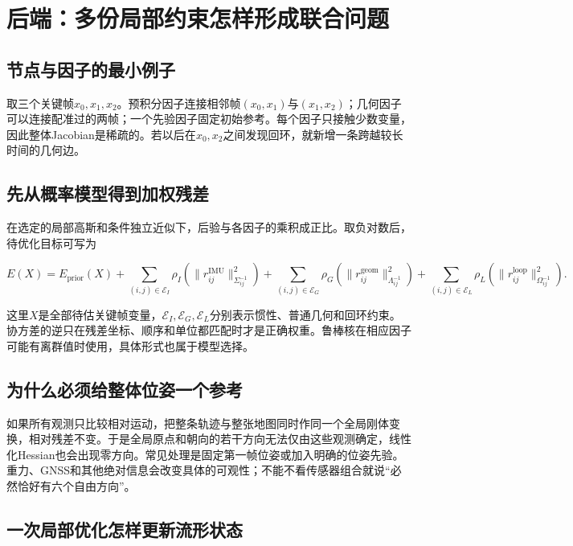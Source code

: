 \section{后端：多份局部约束怎样形成联合问题}

\subsection{节点与因子的最小例子}

取三个关键帧$x_0,x_1,x_2$。预积分因子连接相邻帧$(x_0,x_1)$与$(x_1,x_2)$；几何因子可以连接配准过的两帧；一个先验因子固定初始参考。每个因子只接触少数变量，因此整体Jacobian是稀疏的。若以后在$x_0,x_2$之间发现回环，就新增一条跨越较长时间的几何边。

\subsection{先从概率模型得到加权残差}

在选定的局部高斯和条件独立近似下，后验与各因子的乘积成正比。取负对数后，待优化目标可写为

\begin{equation*}
E(X)=E_{\mathrm{prior}}(X)
+\sum_{(i,j)\in\mathcal E_I}\rho_I\!\left(\|r_{ij}^{\mathrm{IMU}}\|_{\Sigma_{ij}^{-1}}^2\right)
+\sum_{(i,j)\in\mathcal E_G}\rho_G\!\left(\|r_{ij}^{\mathrm{geom}}\|_{\Lambda_{ij}^{-1}}^2\right)
+\sum_{(i,j)\in\mathcal E_L}\rho_L\!\left(\|r_{ij}^{\mathrm{loop}}\|_{\Omega_{ij}^{-1}}^2\right).
\end{equation*}

这里$X$是全部待估关键帧变量，$\mathcal E_I,\mathcal E_G,\mathcal E_L$分别表示惯性、普通几何和回环约束。协方差的逆只在残差坐标、顺序和单位都匹配时才是正确权重。鲁棒核在相应因子可能有离群值时使用，具体形式也属于模型选择。

\subsection{为什么必须给整体位姿一个参考}

如果所有观测只比较相对运动，把整条轨迹与整张地图同时作同一个全局刚体变换，相对残差不变。于是全局原点和朝向的若干方向无法仅由这些观测确定，线性化Hessian也会出现零方向。常见处理是固定第一帧位姿或加入明确的位姿先验。重力、GNSS和其他绝对信息会改变具体的可观性；不能不看传感器组合就说“必然恰好有六个自由方向”。

\subsection{一次局部优化怎样更新流形状态}

